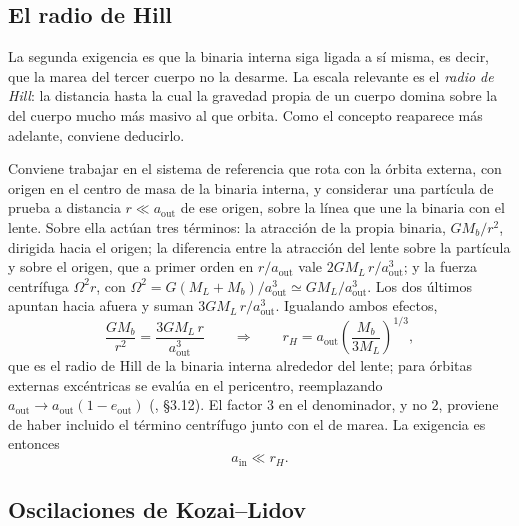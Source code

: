 \documentclass[11pt,a4paper,openany]{book}
\newcommand{\ain}{a_{\mathrm{in}}}
\newcommand{\aout}{a_{\mathrm{out}}}
\begin{document}
\subsection*{El radio de Hill}
\label{sub:hill}

La segunda exigencia es que la binaria interna siga ligada a s\'i misma, es
decir, que la marea del tercer cuerpo no la desarme. La escala relevante es el
\emph{radio de Hill}: la distancia hasta la cual la gravedad propia de un
cuerpo domina sobre la del cuerpo mucho m\'as masivo al que orbita. Como el
concepto reaparece m\'as adelante, conviene deducirlo.

Conviene trabajar en el sistema de referencia que rota con la \'orbita
externa, con origen en el centro de masa de la binaria interna, y considerar
una part\'icula de prueba a distancia $r\ll\aout$ de ese origen, sobre la
l\'inea que une la binaria con el lente. Sobre ella act\'uan tres t\'erminos:
la atracci\'on de la propia binaria, $GM_b/r^{2}$, dirigida hacia el origen;
la diferencia entre la atracci\'on del lente sobre la part\'icula y sobre el
origen, que a primer orden en $r/\aout$ vale $2GM_L\,r/\aout^{3}$; y la fuerza
centr\'ifuga $\Omega^{2}r$, con
$\Omega^{2}=G(M_L+M_b)/\aout^{3}\simeq GM_L/\aout^{3}$. Los dos \'ultimos
apuntan hacia afuera y suman $3GM_L\,r/\aout^{3}$. Igualando ambos efectos,
\begin{equation}
  \frac{GM_b}{r^{2}}=\frac{3GM_L\,r}{\aout^{3}}
  \qquad\Longrightarrow\qquad
  r_H=\aout\left(\frac{M_b}{3M_L}\right)^{1/3},
  \label{eq:hill}
\end{equation}
que es el radio de Hill de la binaria interna alrededor del lente; para
\'orbitas externas exc\'entricas se eval\'ua en el pericentro, reemplazando
$\aout\to\aout(1-e_\mathrm{out})$ (\citealp{MurrayDermott1999}, \S3.12). El
factor $3$ en el denominador, y no $2$, proviene de haber incluido el
t\'ermino centr\'ifugo junto con el de marea. La exigencia es entonces
\begin{equation}
  \ain \ll r_H .
  \label{eq:hill_cond}
\end{equation}

\subsection*{Oscilaciones de Kozai--Lidov}
\label{sub:kozai}
\end{document}
